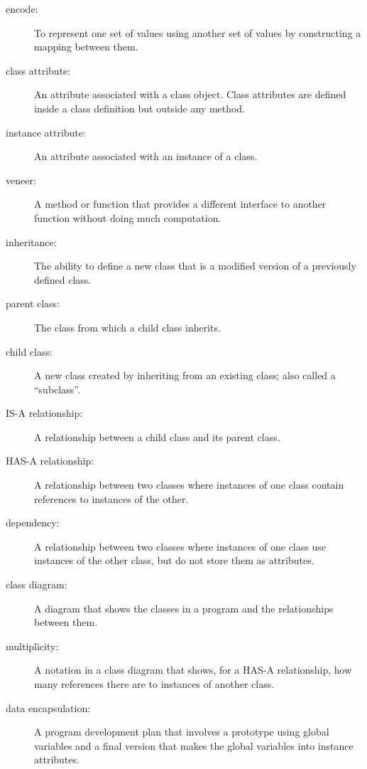 \documentclass[10pt]{book}
\begin{document}
\begin{description}

\item[encode:]  To represent one set of values using another
set of values by constructing a mapping between them.

\item[class attribute:] An attribute associated with a class
object.  Class attributes are defined inside
a class definition but outside any method.

\item[instance attribute:] An attribute associated with an
instance of a class.

\item[veneer:] A method or function that provides a different
interface to another function without doing much computation.

\item[inheritance:] The ability to define a new class that is a
modified version of a previously defined class.

\item[parent class:] The class from which a child class inherits.

\item[child class:] A new class created by inheriting from an
existing class; also called a ``subclass''.

\item[IS-A relationship:] A relationship between a child class
and its parent class.

\item[HAS-A relationship:] A relationship between two classes
where instances of one class contain references to instances of
the other.

\item[dependency:] A relationship between two classes
where instances of one class use instances of the other class,
but do not store them as attributes.

\item[class diagram:] A diagram that shows the classes in a program
and the relationships between them.

\item[multiplicity:] A notation in a class diagram that shows, for
a HAS-A relationship, how many references there are to instances
of another class.

\item[data encapsulation:]  A program development plan that
involves a prototype using global variables and a final version
that makes the global variables into instance attributes. 

\end{description}
\end{document}
